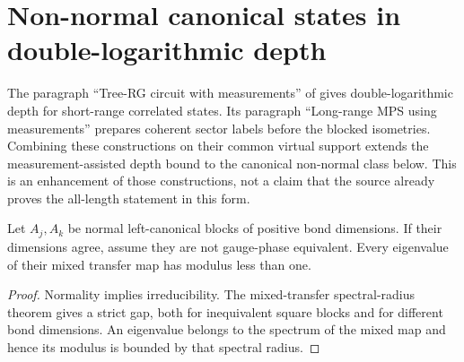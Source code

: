 \section{Non-normal canonical states in double-logarithmic depth}
\label{sec:ldp_nonnormal_trees}

The paragraph ``Tree-RG circuit with measurements'' of
\cite{Malz2024Preparation} gives double-logarithmic depth for short-range
correlated states. Its paragraph ``Long-range MPS using measurements''
prepares coherent sector labels before the blocked isometries. Combining
these constructions on their common virtual support extends the
measurement-assisted depth bound to the canonical non-normal class below.
This is an enhancement of those constructions, not a claim that the source
already proves the all-length statement in this form.

\begin{lemma}
    \label{thm:ldp_inequivalent_mixed_gap}
    \leanok
    Let $A_j,A_k$ be normal left-canonical blocks of positive bond dimensions.
    If their dimensions agree, assume they are not gauge-phase equivalent.
    Every eigenvalue of their mixed transfer map has modulus less than one.
\end{lemma}
\begin{proof}
    \leanok
    Normality implies irreducibility. The mixed-transfer spectral-radius
    theorem gives a strict gap, both for inequivalent square blocks and for
    different bond dimensions. An eigenvalue belongs to the spectrum of
    the mixed map and hence its modulus is bounded by that spectral radius.
\end{proof}

